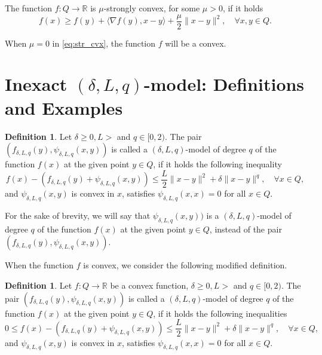 \documentclass[11pt]{amsart}
\theoremstyle{definition}
\newtheorem{definition}[theorem]{Definition}
\numberwithin{equation}{section}
\begin{document}
The function $f: Q \longrightarrow \mathbb{R}$ is $\mu$-strongly convex, for some $\mu >  0$,  if it holds
\begin{equation}\label{eq:str_cvx}
    f(x) \geq f(y) + \langle \nabla f(y),x - y \rangle + \frac{\mu}{2}\|x - y\|^2, \quad  \forall x, y \in Q. 
\end{equation}

When $\mu = 0$ in \eqref{eq:str_cvx}, the function $f$ will be a convex.

\section{Inexact $(\delta, L, q)$-model: Definitions and Examples}\label{sect:def_model_q}

\begin{definition}\label{def_neq_inex_model_non_convex}
Let $\delta \geq 0, L>$ and $q \in [0,2)$. The pair $(f_{\delta, L, q} (y), \psi_{\delta, L ,  q} (x, y))$ is called a $(\delta, L, q)$-model of degree $q$ of the function $f(x)$ at the given point $y \in Q$, if it holds the following inequality
\begin{equation}\label{ineq_inex_model_1}
    f(x) - \left( f_{\delta, L, q} (y) + \psi_{\delta, L, q} (x, y)\right) \leq \frac{L}{2} \|x - y\|^2 + \delta \|x - y\|^q, \quad \forall x \in Q,
\end{equation}
and $\psi_{\delta, L,  q} (x, y)$  is convex in $x$, satisfies $\psi_{\delta, L ,  q}(x,x) = 0$  for all $x \in Q$. 

For the sake of brevity, we will say that $\psi_{\delta, L ,  q} (x, y))$ is a $(\delta, L, q)$-model of degree $q$ of the function $f(x)$ at the given point $y \in Q$, instead of the pair $(f_{\delta, L, q} (y), \psi_{\delta, L ,  q} (x, y))$. 
\end{definition}

When the function $f$  is convex, we consider the following modified definition. 

\begin{definition}\label{def_neq_inex_model_convex}
Let $f: Q \longrightarrow \mathbb{R}$ be a convex function, $\delta \geq 0, L>$ and $q \in [0,2)$. The pair $(f_{\delta, L, q} (y), \psi_{\delta, L ,  q} (x, y))$ is called a $(\delta, L, q)$-model of degree $q$ of the function $f(x)$ at the given point $y \in Q$, if it holds the following inequalities
\begin{equation}\label{ineq_inex_model_convex}
    0 \leq f(x) - \left( f_{\delta, L, q} (y) + \psi_{\delta, L, q} (x, y)\right) \leq \frac{L}{2} \|x - y\|^2 + \delta \|x - y\|^q, \quad \forall x \in Q,
\end{equation}
and $\psi_{\delta, L,  q} (x, y)$  is convex in $x$, satisfies $\psi_{\delta, L ,  q}(x,x) = 0$  for all $x \in Q$. 
\end{definition}
\end{document}
